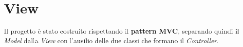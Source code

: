 \documentclass[10pt,a4paper,openany]{article}
\begin{document}
\section{View}

Il progetto è stato costruito rispettando il \textbf{pattern MVC}, separando quindi il \textit{Model} dalla \textit{View} con l'ausilio delle due classi che formano il \textit{Controller}.

	





\end{document}
